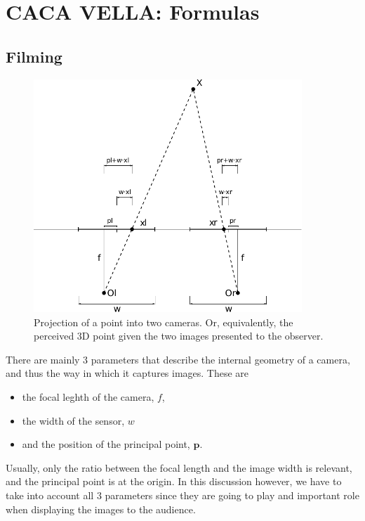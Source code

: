 \documentclass[12pt,a4paper]{article}
\def\p{\mathbf p}
\begin{document}
\section{CACA VELLA: Formulas}



\subsection{Filming}
\begin{figure}
 \begin{center}
  \includegraphics[width=0.9\textwidth]{stereo_projection.pdf}
 \end{center}
 \caption{Projection of a point into two cameras.  Or, equivalently, the perceived 3D point given the two images presented to the observer.}
\end{figure}


There are mainly 3 parameters that describe the internal geometry of a camera, and thus the way in which it captures images.  These are
\begin{itemize}
 \item the focal leghth of the camera, $f$,
 \item the width of the sensor, $w$
 \item and the position of the principal point, $\p$.
\end{itemize}
Usually, only the ratio between the focal length and the image width is relevant, and the principal point is at the origin.  In this discussion however, we have to take into account all 3 parameters since they are going to play and important role when displaying the images to the audience.
\end{document}

